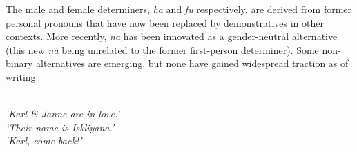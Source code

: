 
The male and female determiners, \textit{ha} and \textit{fu} respectively, are derived from former personal pronouns that have now been replaced by demonstratives in other contexts. More recently, \textit{na} has been innovated as a gender-neutral alternative (this new \textit{na} being unrelated to the former first-person determiner). Some non-binary alternatives are emerging, but none have gained widespread traction as of writing.

\pex
\a
{}\\
\textit{`Karl \& Janne are in love.'}
\a
{}\\
\textit{`Their name is Iskliyana.'}
\a
{}\\
\textit{`Karl, come back!'}
\xe